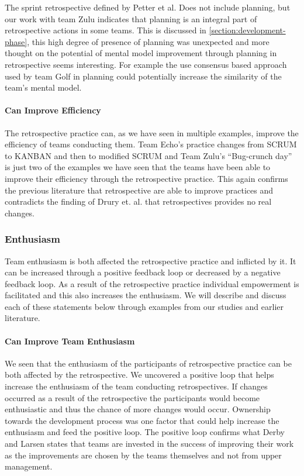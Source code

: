 The sprint retrospective defined by Petter et al. Does not include planning, but our work with team Zulu indicates that planning is an integral part of retrospective actions in some teams. This is discussed in \autoref{section:development-phase}, this high degree of presence of planning was unexpected and more thought on the potential of mental model improvement through planning in retrospective seems interesting. For example the use consensus based approach used by team Golf in planning could potentially increase the similarity of the team's mental model.

\paragraph{Can Improve Efficiency}
The retrospective practice can, as we have seen in multiple examples, improve the efficiency of teams conducting them. Team Echo's practice changes from SCRUM to KANBAN and then to modified SCRUM and Team Zulu's ``Bug-crunch day'' is just two of the examples we have seen that the teams have been able to improve their efficiency through the retrospective practice. This again confirms the previous literature \cite{Dingsoyr2004, Larsen2006, Kinoshita2008} that retrospective are able to improve practices and contradicts the finding of Drury et. al. \cite{Drury2012} that retrospectives provides no real changes.

\subsubsection{Enthusiasm}
Team enthusiasm is both affected the retrospective practice and inflicted by it. It can be increased through a positive feedback loop or decreased by a negative feedback loop. As a result of the retrospective practice individual empowerment is facilitated and this also increases the enthusiasm. We will describe and discuss each of these statements below through examples from our studies and earlier literature. 

\paragraph{Can Improve Team Enthusiasm}
We seen that the enthusiasm of the participants of retrospective practice can be both affected by the retrospective. We uncovered a positive loop that helps increase the enthusiasm of the team conducting retrospectives. If changes occurred as a result of the retrospective the participants would become enthusiastic and thus the chance of more changes would occur. Ownership towards the development process was one factor that could help increase the enthusiasm and feed the positive loop. The positive loop confirms what Derby and Larsen \cite{Larsen2006} states that teams are invested in the success of improving their work as the improvements are chosen by the teams themselves and not from upper management. 

